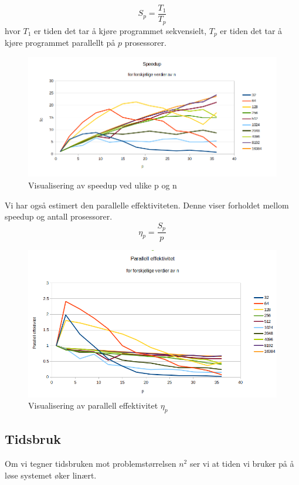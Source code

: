 \documentclass[11pt,norsk,a4paper]{article}
\begin{document}
$$ S_p = \frac{T_1}{T_p}$$
hvor $T_1$ er tiden det tar å kjøre programmet sekvensielt, $T_p$ er tiden det tar å kjøre programmet parallellt på $p$ prosessorer. 

\begin{figure}[h]
\centering
\includegraphics[scale=0.425]{plot_speedup.png}
\caption{Visualisering av speedup ved ulike p og n}
\end{figure}

Vi har også estimert den parallelle effektiviteten. Denne viser forholdet mellom speedup og antall prosessorer. 
$$ \eta_p = \frac{S_p}{p}$$

\begin{figure}[h]
\centering
\includegraphics[scale=0.5]{plot_parallell.png}
\caption{Visualisering av parallell effektivitet $\eta_p$}
\end{figure}

\subsection{Tidsbruk}

Om vi tegner tidsbruken mot problemstørrelsen $n^2$ ser vi at tiden vi bruker på å løse systemet øker linært. 
\end{document}
